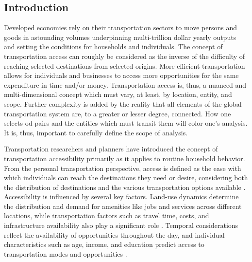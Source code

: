 \documentclass[11pt]{article}
\begin{document}
\begin{multicols}{2}

\section*{Introduction}

Developed economies rely on their transportation sectors to move persons and goods in astounding volumes underpinning multi-trillion dollar yearly outputs and setting the conditions for households and individuals. The concept of transportation access can roughly be considered as the inverse of the difficulty of reaching selected destinations from selected origins. More efficient transportation allows for individuals and businesses to access more opportunities for the same expenditure in time and/or money. Transportation access is, thus, a nuanced and multi-dimensional concept which must vary, at least, by location, entity, and scope. Further complexity is added by the reality that all elements of the global transportation system are, to a greater or lesser degree, connected. How one selects \gls{od} pairs and the entities which must transit them will color one's analysis. It is, thus, important to carefully define the scope of analysis.

Transportation researchers and planners have introduced the concept of transportation accessibility primarily as it applies to routine household behavior. From the personal transportation perspective, access is defined as the ease with which individuals can reach the destinations they need or desire, considering both the distribution of destinations and the various transportation options available \cite{Handy_2020}. Accessibility is influenced by several key factors. Land-use dynamics determine the distribution and demand for amenities like jobs and services across different locations, while transportation factors such as travel time, costs, and infrastructure availability also play a significant role \cite{Geurs_2004}. Temporal considerations reflect the availability of opportunities throughout the day, and individual characteristics such as age, income, and education predict access to transportation modes and opportunities \cite{Miller_2018}.


\end{multicols}
\end{document}
